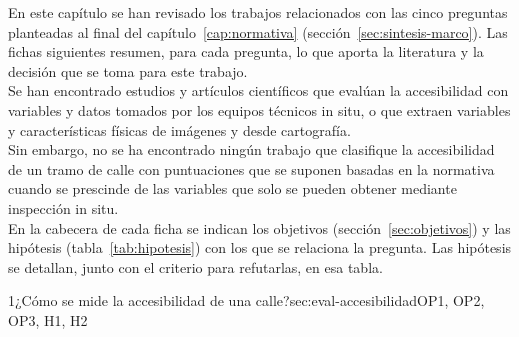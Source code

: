 En este capítulo se han revisado los trabajos relacionados con las cinco preguntas planteadas al final del capítulo~\ref{cap:normativa} (sección~\ref{sec:sintesis-marco}).
Las fichas siguientes resumen, para cada pregunta, lo que aporta la literatura y la decisión que se toma para este trabajo.
\\

Se han encontrado estudios y artículos científicos que evalúan la accesibilidad con variables y datos tomados por los equipos técnicos in situ, o que extraen variables y características físicas de imágenes y desde cartografía.
\\

Sin embargo, no se ha encontrado ningún trabajo que clasifique la accesibilidad de un tramo de calle con puntuaciones que se suponen basadas en la normativa cuando se prescinde de las variables que solo se pueden obtener mediante inspección in situ.
\\

En la cabecera de cada ficha se indican los objetivos (sección~\ref{sec:objetivos}) y las hipótesis (tabla~\ref{tab:hipotesis}) con los que se relaciona la pregunta. Las hipótesis se detallan, junto con el criterio para refutarlas, en esa tabla.
\\

\begin{fichasintesis}{1}{¿Cómo se mide la accesibilidad de una calle?}{sec:eval-accesibilidad}{OP1, OP2, OP3, H1, H2}
\end{fichasintesis}

